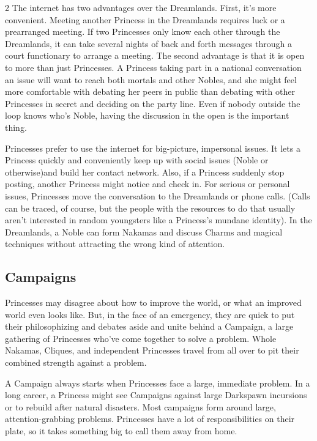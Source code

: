 \begin{multicols}{2}
The internet has two advantages over the Dreamlands. First, it's more convenient. Meeting another Princess in the Dreamlands requires luck or a prearranged meeting. If two Princesses only know each other through the Dreamlands, it can take several nights of back and forth messages through a court functionary to arrange a meeting. The second advantage is that it is open to more than just Princesses. A Princess taking part in a national conversation an issue will want to reach both mortals and other Nobles, and she might feel more comfortable with debating her peers in public than debating with other Princesses in secret and deciding on the party line. Even if nobody outside the loop knows who's Noble, having the discussion in the open is the important thing.

Princesses prefer to use the internet for big-picture, impersonal issues. It lets a Princess quickly and conveniently keep up with social issues (Noble or otherwise)and build her contact network. Also, if a Princess suddenly stop posting, another Princess might notice and check in. For serious or personal issues, Princesses move the conversation to the Dreamlands or phone calls. (Calls can be traced, of course, but the people with the resources to do that usually aren't interested in random youngsters like a Princess's mundane identity). In the Dreamlands, a Noble can form Nakamas and discuss Charms and magical techniques without attracting the wrong kind of attention. 

\subsection*{Campaigns}

Princesses may disagree about how to improve the world, or what an improved world even looks like. But, in the face of an emergency, they are quick to put their philosophizing and debates aside and unite behind a Campaign, a large gathering of Princesses who've come together to solve a problem. Whole Nakamas, Cliques, and independent Princesses travel from all over to pit their combined strength against a problem. 

A Campaign always starts when Princesses face a large, immediate problem. In a long career, a Princess might see Campaigns against large Darkspawn incursions or to rebuild after natural disasters. Most campaigns form around large, attention-grabbing problems. Princesses have a lot of responsibilities on their plate, so it takes something big to call them away from home. 


\end{multicols}
